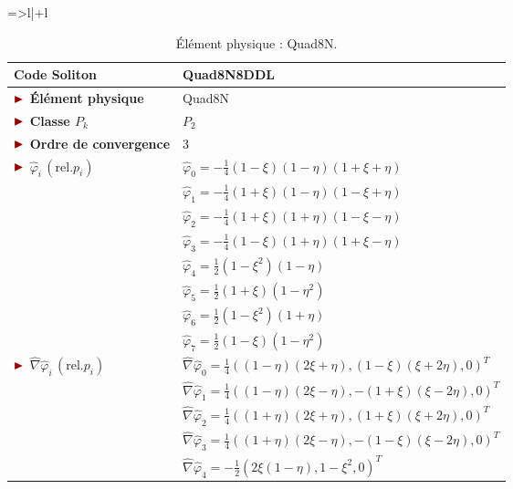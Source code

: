 \begin{table}[H]
\begin{minipage}[t]{0.48\linewidth}
\begin{tabular}{=>{\bfseries}l|+l}
		\end{tabular}
		\caption{Élément physique : Quad8N.}
		\label{tab:Quad8N}
	\end{minipage}\hfill
\begin{minipage}[t]{0.48\linewidth}
\centering
\hspace*{-2.25cm}
		\begin{tabular}{>{\bfseries} l|l}
			\toprule %
			\rowcolor{black!10}\rowstyle{\color{MyRed}\bfseries} Code Soliton & \textcolor{MyRed}{\textbf{Quad8N8DDL}}\\
			\midrule
			$\mytriangle$ Élément physique & \textcolor{MyRed}{Quad8N}\\
			$\mytriangle$ Classe $P_k$ & $P_2$\\
			$\mytriangle$ Ordre de convergence & 3\\
			\midrule
			$\mytriangle$ $\widehat{\varphi}_i\, (\text{rel.} p_i)$ &  $\widehat{\varphi}_0 = -\frac{1}{4}(1-\xi)(1-\eta)(1+\xi+\eta)$\\
			&  $\widehat{\varphi}_1 = -\frac{1}{4}(1+\xi)(1-\eta)(1-\xi+\eta)$\\
			&  $\widehat{\varphi}_2 = -\frac{1}{4}(1+\xi)(1+\eta)(1-\xi-\eta)$\\
			&  $\widehat{\varphi}_3 = -\frac{1}{4}(1-\xi)(1+\eta)(1+\xi-\eta)$\\
			&  $\widehat{\varphi}_4 = \frac{1}{2}(1-\xi^2)(1-\eta)$\\
			&  $\widehat{\varphi}_5 = \frac{1}{2}(1+\xi)(1-\eta^2)$\\
			&  $\widehat{\varphi}_6 = \frac{1}{2}(1-\xi^2)(1+\eta)$\\
			&  $\widehat{\varphi}_7 = \frac{1}{2}(1-\xi)(1-\eta^2)$\\
			\midrule
			$\mytriangle$ $\widehat{\nabla}\widehat{\varphi}_i\, (\text{rel.} p_i)$ & $\widehat{\nabla}\widehat{\varphi}_0 = \frac{1}{4}\left((1-\eta)(2\xi+\eta), (1-\xi)(\xi+2\eta), 0\right)^T$ \\
			& $\widehat{\nabla}\widehat{\varphi}_1 = \frac{1}{4}\left((1-\eta)(2\xi-\eta), -(1+\xi)(\xi-2\eta), 0\right)^T$ \\
			& $\widehat{\nabla}\widehat{\varphi}_2 = \frac{1}{4}\left((1+\eta)(2\xi+\eta), (1+\xi)(\xi+2\eta), 0\right)^T$ \\
			& $\widehat{\nabla}\widehat{\varphi}_3 = \frac{1}{4}\left((1+\eta)(2\xi-\eta), -(1-\xi)(\xi-2\eta), 0\right)^T$ \\
			& $\widehat{\nabla}\widehat{\varphi}_4 = -\frac{1}{2}\left(2\xi(1-\eta), 1-\xi^2, 0\right)^T$ \\

\end{tabular}
\end{minipage}
\end{table}
